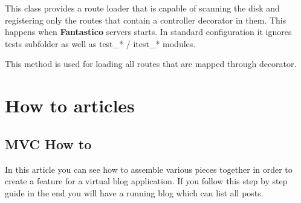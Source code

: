 \documentclass[letterpaper,10pt,english]{sphinxmanual}
\begin{document}
\begin{fulllineitems}
\label{features/mvc:fantastico.mvc.controller_registrator.ControllerRouteLoader}
This class provides a route loader that is capable of scanning the disk and registering only the routes that 
contain a controller decorator in them. This happens when \textbf{Fantastico} servers starts. In standard configuration
it ignores tests subfolder as well as test\_* / itest\_* modules.

\begin{fulllineitems}
\label{features/mvc:fantastico.mvc.controller_registrator.ControllerRouteLoader.load_routes}
This method is used for loading all routes that are mapped through 
{\hyperref[features/mvc:fantastico.mvc.controller_decorators.Controller]{}} decorator.

\end{fulllineitems}


\end{fulllineitems}



\chapter{How to articles}
\label{how_to/how_to:how-to-articles}\label{how_to/how_to::doc}

\section{MVC How to}
\label{how_to/mvc_how_to::doc}\label{how_to/mvc_how_to:mvc-how-to}
In this article you can see how to assemble various pieces together in order to create a feature for a virtual blog application.
If you follow this step by step guide in the end you will have a running blog which can list all posts.
\end{document}
